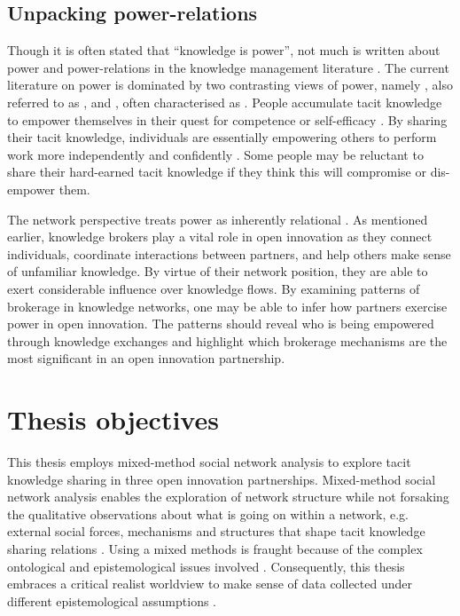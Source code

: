\subsection{Unpacking power-relations} 

Though it is often stated that \enquote{knowledge is power}, not much is written about power and power-relations in the knowledge management literature \citep{haugaard2012rethinking}. The current literature on power is dominated by two contrasting views of power, namely , also referred to as , and , often characterised as  \citep{haugaard2012rethinking}.  People accumulate tacit knowledge to empower themselves in their quest for competence or self-efficacy \citep{endres2007tacit}. By sharing their tacit knowledge, individuals are essentially empowering others to perform work more independently and confidently \citep{bordum2002tacit,lin2007share}. Some people may be reluctant to share their hard-earned tacit knowledge if they think this will compromise or dis-empower them. \medskip

The network perspective treats power as inherently relational \citep{ibarra1993power}. As mentioned earlier, knowledge brokers play a vital role in open innovation as they connect individuals, coordinate interactions between partners, and help others make sense of unfamiliar knowledge. By virtue of their network position, they are able to exert considerable influence over knowledge flows. By examining patterns of brokerage in knowledge networks, one may be able to infer how partners exercise power in open innovation. The patterns should reveal who is being empowered through knowledge exchanges and highlight which brokerage mechanisms are the most significant in an open innovation partnership. 

\section{Thesis objectives}

This thesis employs mixed-method social network analysis to explore tacit knowledge sharing in three open innovation partnerships. Mixed-method social network analysis enables the exploration of network structure while not forsaking the qualitative observations about what is going on within a network, e.g. external social forces, mechanisms and structures that shape tacit knowledge sharing relations \citep{crossley2010social}. Using a mixed methods is fraught because of the complex ontological and epistemological issues involved \citep{giddings2006mixed,mcevoy2006critical}. Consequently, this thesis embraces a critical realist worldview to make sense of data collected under different epistemological assumptions \citep{johnson2004mixed,giddings2006mixed,welch2011theorising}. \medskip

